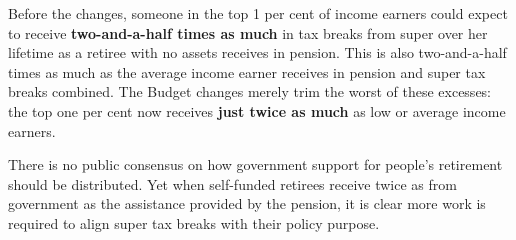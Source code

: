 \documentclass[continuous]{grattan}
\begin{document}
Before the changes, someone in the top 1 per cent of income earners could expect to receive \textbf{two-and-a-half times as much} in tax breaks from super over her lifetime as a retiree with no assets receives in pension. 
This is also two-and-a-half times as much as the average income earner receives in pension and super tax breaks combined. 
The Budget changes merely trim the worst of these excesses: the top one per cent now receives \textbf{just twice as much} as low or average income earners.

There is no public consensus on how government support for people's retirement should be distributed. 
Yet when self-funded retirees receive twice as from government as the assistance provided by the pension, it is clear more work is required to align super tax breaks with their policy purpose.
\end{document}
